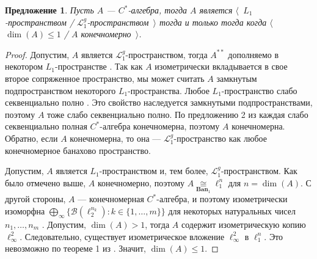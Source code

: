 \documentclass[12pt]{article}
\newtheorem{proposition}[theorem]{Предложение}
\newcommand{\isom}[1]{\mathop{\mathbin{\cong}}\limits_{#1}}
\begin{document}
\begin{proposition}\label{CStarAlgIsL1IfFinDim} Пусть $A$ --- $C^*$-алгебра, тогда $A$ является $\langle$~$L_1$-пространством / $\mathcal{L}_1^g$-пространством~$\rangle$ тогда и только тогда когда $\langle$~$\operatorname{dim}(A)\leq 1$ / $A$ конечномерно~$\rangle$.
\end{proposition}
\begin{proof} Допустим, $A$ является $\mathcal{L}_1^g$-пространством, тогда $A^{**}$ дополняемо в некотором $L_1$-пространстве \cite[следствие 23.2.1(2)]{DefFloTensNorOpId}. Так как $A$ изометрически вкладывается в свое второе сопряженное пространство, мы может считать $A$ замкнутым подпространством некоторого $L_1$-пространства. Любое $L_1$-пространство слабо секвенциально полно \cite[следствие III.C.14]{WojBanSpForAnalysts}. Это свойство наследуется замкнутыми подпространствами, поэтому $A$ тоже слабо секвенциально полно. По предложению 2 из \cite{SakWeakCompOpOnOpAlg} каждая слабо секвенциально полная $C^*$-алгебра конечномерна, поэтому $A$ конечномерна. Обратно, если $A$ конечномерна, то она --- $\mathcal{L}_1^g$-пространство как любое конечномерное банахово пространство.

Допустим, $A$ является $L_1$-пространством и, тем более, $\mathcal{L}_1^g$-пространством. Как было отмечено выше, $A$ конечномерно, поэтому $A\isom{\mathbf{Ban}_1}\ell_1^n$ для $n=\operatorname{dim}(A)$. С другой стороны, $A$ --- конечномерная $C^*$-алгебра, и поэтому изометрически изоморфна $\bigoplus_\infty\{ \mathcal{B}(\ell_2^{n_k}):k\in\{1,\ldots,m\}\}$ для некоторых натуральных чисел $n_1,\ldots,n_m$ \cite[теорема III.1.1]{DavCSatrAlgByExmpl}. Допустим, $\operatorname{dim}(A)>1$, тогда $A$ содержит изометрическую копию $\ell_\infty^2$. Следовательно, существует изометрическое вложение $\ell_\infty^2$ в $\ell_1^n$. Это невозможно по теореме 1 из \cite{LyubIsomEmdbFinDimLp}. Значит, $\operatorname{dim}(A)\leq 1$. 
\end{proof}
\end{document}
